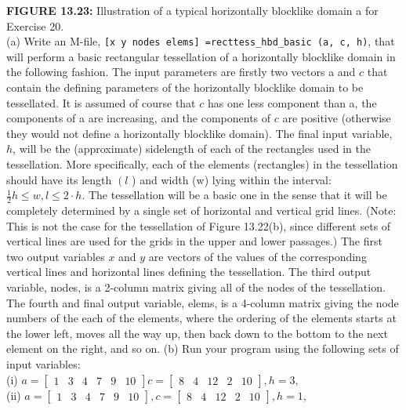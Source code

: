 \documentclass[../main.tex]{subfiles}
\begin{document}
\begin{enumerate}
\begin{figure}[H]
	\centering
	\label{pfig:ch13_8}
\end{figure}
\textbf{FIGURE 13.23:}  Illustration of a typical horizontally blocklike domain a for Exercise 20.
\\
(a) Write an M-file, \texttt{[x  y  nodes elems] =recttess\_hbd\_basic (a, c, h)}, that will perform a basic rectangular tessellation of a horizontally blocklike domain in the following fashion. The input parameters are firstly two vectors a and $c$ that contain the defining parameters of the horizontally blocklike domain to be tessellated. It is assumed of course that $c$ has one less component than a, the components of a are increasing, and the components of $c$ are positive (otherwise they would not define a horizontally blocklike domain).
The final input variable, $h$, will be the (approximate) sidelength of each of the rectangles used in the tessellation. More specifically, each of the elements (rectangles) in the tessellation should have its length $\left(l\right.$ ) and width (w) lying within the interval: $\frac{1}{2} h \leq w, l \leq 2 \cdot h$. The tessellation will be a basic one in the sense that it will be completely determined by a single set of horizontal and vertical grid lines. (Note: This is not the case for the tessellation of Figure 13.22(b), since different sets of vertical lines are used for the grids in the upper and lower passages.) The first two output variables $x$ and $y$ are vectors of the values of the corresponding vertical lines and horizontal lines defining the tessellation. The third output variable, nodes, is a 2-column matrix giving all of the nodes of the tessellation. The fourth and final output variable, elems, is a 4-column matrix giving the node numbers of the each of the elements, where the ordering of the elements starts at the lower left, moves all the way up, then back down to the bottom to the next element on the right, and so on.
(b) Run your program using the following sets of input variables:
\\
(i) $a=\left[\begin{array}{llllll}1 & 3 & 4 & 7 & 9&10\end{array}\right] c=\left[\begin{array}{lllll}8&4&12&2&10
\end{array}\right], h = 3,$
\\
(ii) $a=\left[\begin{array}{llllll}1&3&4&7&9&10\end{array}\right], c=\left[\begin{array}{lllll}8&4 & 12&2&10\end{array}\right], h=1$,

\end{enumerate}
\end{document}

